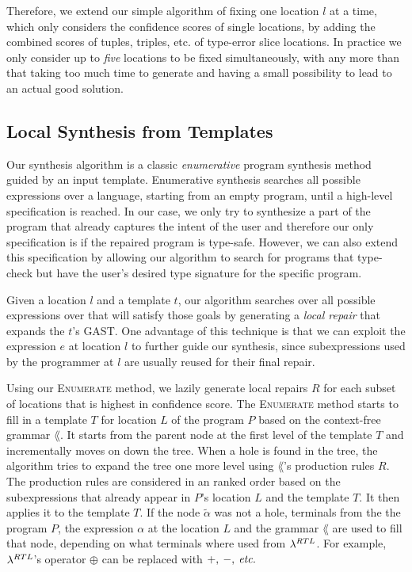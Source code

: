 Therefore, we extend our simple algorithm of fixing one location $l$ at a time,
which only considers the confidence scores of single locations, by adding the
combined scores of tuples, triples, etc. of type-error slice locations. In
practice we only consider up to \emph{five} locations to be fixed
simultaneously, with any more than that taking too much time to generate and
having a small possibility to lead to an actual good solution.


\subsection{Local Synthesis from Templates}
\label{subsec:local-synthesis}

Our synthesis algorithm is a classic \emph{enumerative} program synthesis method
guided by an input template. Enumerative synthesis searches all possible
expressions over a language, starting from an empty program, until a high-level
specification is reached. In our case, we only try to synthesize a part of the
program that already captures the intent of the user and therefore our only
specification is if the repaired program is type-safe. However, we can also
extend this specification by allowing our algorithm to search for programs that
type-check but have the user's desired type signature for the specific program.

Given a location $l$ and a template $t$, our algorithm searches over all
possible expressions over \lang that will satisfy those goals by generating a
\emph{local repair} that expands the $t$'s GAST. One advantage of this technique
is that we can exploit the expression $e$ at location $l$ to further guide our
synthesis, since subexpressions used by the programmer at $l$ are usually reused
for their final repair.



Using our \textsc{Enumerate} method, we lazily generate local repairs $R$ for
each subset of locations that is highest in confidence score. The
\textsc{Enumerate} method starts to fill in a template $T$ for location $L$ of
the program $P$ based on the context-free grammar $\lang$. It starts from the
parent node at the first level of the template $T$ and incrementally moves on
down the tree. When a hole is found in the tree, the algorithm tries to expand
the tree one more level using $\lang$'s production rules $R$. The production
rules are considered in an ranked order based on the subexpressions that already
appear in $P$'s location $L$ and the template $T$. It then applies it to the
template $T$. If the node $\tilde{\alpha}$ was not a hole, terminals from the
the program $P$, the expression $\alpha$ at the location $L$ and the grammar
$\lang$ are used to fill that node, depending on what terminals where used from
$\lambda^{RTL}$. For example, $\lambda^{RTL}$'s operator $\oplus$ can be replaced
with $+,\:-,\:\textit{etc.}$

